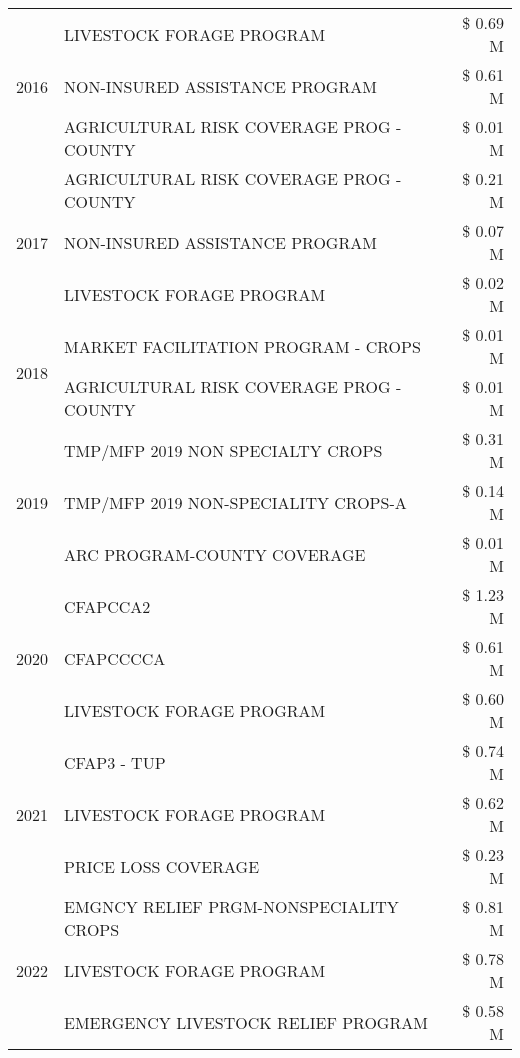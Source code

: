\begin{tabular}{llr}
\cline{1-3}
\multirow[t]{3}{*}{2016} & LIVESTOCK FORAGE PROGRAM & \$ 0.69 M \\
 & NON-INSURED ASSISTANCE PROGRAM & \$ 0.61 M \\
 & AGRICULTURAL RISK COVERAGE PROG - COUNTY & \$ 0.01 M \\
\cline{1-3}
\multirow[t]{3}{*}{2017} & AGRICULTURAL RISK COVERAGE PROG - COUNTY & \$ 0.21 M \\
 & NON-INSURED ASSISTANCE PROGRAM & \$ 0.07 M \\
 & LIVESTOCK FORAGE PROGRAM & \$ 0.02 M \\
\cline{1-3}
\multirow[t]{2}{*}{2018} & MARKET FACILITATION PROGRAM - CROPS & \$ 0.01 M \\
 & AGRICULTURAL RISK COVERAGE PROG - COUNTY & \$ 0.01 M \\
\cline{1-3}
\multirow[t]{3}{*}{2019} & TMP/MFP 2019 NON SPECIALTY CROPS & \$ 0.31 M \\
 & TMP/MFP 2019 NON-SPECIALITY CROPS-A & \$ 0.14 M \\
 & ARC PROGRAM-COUNTY COVERAGE & \$ 0.01 M \\
\cline{1-3}
\multirow[t]{3}{*}{2020} & CFAPCCA2 & \$ 1.23 M \\
 & CFAPCCCCA & \$ 0.61 M \\
 & LIVESTOCK FORAGE PROGRAM & \$ 0.60 M \\
\cline{1-3}
\multirow[t]{3}{*}{2021} & CFAP3 - TUP & \$ 0.74 M \\
 & LIVESTOCK FORAGE PROGRAM & \$ 0.62 M \\
 & PRICE LOSS COVERAGE & \$ 0.23 M \\
\cline{1-3}
\multirow[t]{3}{*}{2022} & EMGNCY RELIEF PRGM-NONSPECIALITY CROPS & \$ 0.81 M \\
 & LIVESTOCK FORAGE PROGRAM & \$ 0.78 M \\
 & EMERGENCY LIVESTOCK RELIEF PROGRAM & \$ 0.58 M \\
\cline{1-3}
\bottomrule
\end{tabular}
